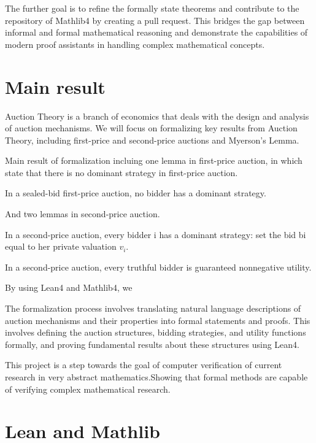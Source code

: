 The further goal is to refine the formally state theorems and contribute to the repository of Mathlib4 by creating a pull request. This bridges the gap between informal and formal mathematical reasoning and demonstrate the capabilities of modern proof assistants in handling complex mathematical concepts.

\section{Main result}
Auction Theory is a branch of economics that deals with the design and analysis of auction mechanisms. We will focus on formalizing key results from Auction Theory, including first-price and second-price auctions and Myerson's Lemma. 

Main result of formalization incluing one lemma in first-price auction, in which state that there is no dominant strategy in first-price auction. 

\begin{lemma}
In a sealed-bid first-price auction, no bidder has a dominant strategy.
\end{lemma}

And two lemmas in second-price auction.

\begin{lemma}
In a second-price auction, every bidder i has a dominant strategy: set the bid bi equal to her private valuation \(v_i\).
\end{lemma}

\begin{lemma} In a second-price auction, every truthful bidder is guaranteed nonnegative utility.
\end{lemma}

By using Lean4 and Mathlib4, we 


The formalization process involves translating natural language descriptions of auction mechanisms and their properties into formal statements and proofs. This involves defining the auction structures, bidding strategies, and utility functions formally, and proving fundamental results about these structures using Lean4. 

This project is a step towards the goal of computer verification of current research in very abstract mathematics.Showing that formal methods are capable of verifying complex mathematical research.

\section{Lean and Mathlib}

